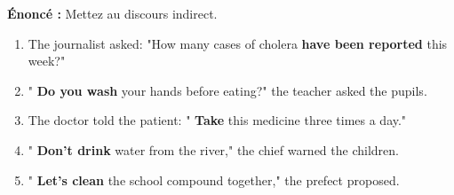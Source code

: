 \documentclass[11pt]{article}
\begin{document}
\begin{exoresolu}
\textbf{Énoncé :} Mettez au discours indirect.

\begin{enumerate}
    \item The journalist asked: "How many cases of cholera \textbf{have been reported} this week?"
    \item " \textbf{Do you wash} your hands before eating?" the teacher asked the pupils.
    \item The doctor told the patient: " \textbf{Take} this medicine three times a day."
    \item " \textbf{Don't drink} water from the river," the chief warned the children.
    \item " \textbf{Let's clean} the school compound together," the prefect proposed.
\end{enumerate}


\end{exoresolu}
\end{document}

